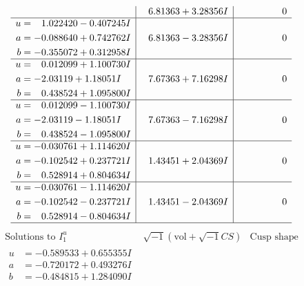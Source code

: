 \documentclass[1p]{elsarticle_modified}
\theoremstyle{definition}
\newcommand{\I}{\sqrt{-1}}
\begin{document}
$$\begin{array}{c|c|c}
 & \phantom{-}6.81363 + 3.28356 I & \phantom{-0.000000 } 0 \\ \hline\begin{aligned}
u &= \phantom{-}1.022420 - 0.407245 I \\
a &= -0.088640 + 0.742762 I \\
b &= -0.355072 + 0.312958 I\end{aligned}
 & \phantom{-}6.81363 - 3.28356 I & \phantom{-0.000000 } 0 \\ \hline\begin{aligned}
u &= \phantom{-}0.012099 + 1.100730 I \\
a &= -2.03119 + 1.18051 I \\
b &= \phantom{-}0.438524 + 1.095800 I\end{aligned}
 & \phantom{-}7.67363 + 7.16298 I & \phantom{-0.000000 } 0 \\ \hline\begin{aligned}
u &= \phantom{-}0.012099 - 1.100730 I \\
a &= -2.03119 - 1.18051 I \\
b &= \phantom{-}0.438524 - 1.095800 I\end{aligned}
 & \phantom{-}7.67363 - 7.16298 I & \phantom{-0.000000 } 0 \\ \hline\begin{aligned}
u &= -0.030761 + 1.114620 I \\
a &= -0.102542 + 0.237721 I \\
b &= \phantom{-}0.528914 + 0.804634 I\end{aligned}
 & \phantom{-}1.43451 + 2.04369 I & \phantom{-0.000000 } 0 \\ \hline\begin{aligned}
u &= -0.030761 - 1.114620 I \\
a &= -0.102542 - 0.237721 I \\
b &= \phantom{-}0.528914 - 0.804634 I\end{aligned}
 & \phantom{-}1.43451 - 2.04369 I & \phantom{-0.000000 } 0\\
 \hline 
 \end{array}$$\newpage$$\begin{array}{c|c|c}  
\text{Solutions to }I^u_{1}& \I (\text{vol} + \sqrt{-1}CS) & \text{Cusp shape}\\
 \hline 
\begin{aligned}
u &= -0.589533 + 0.655355 I \\
a &= -0.720172 + 0.493276 I \\
b &= -0.484815 + 1.284090 I\end{aligned}

\end{array}$$
\end{document}
